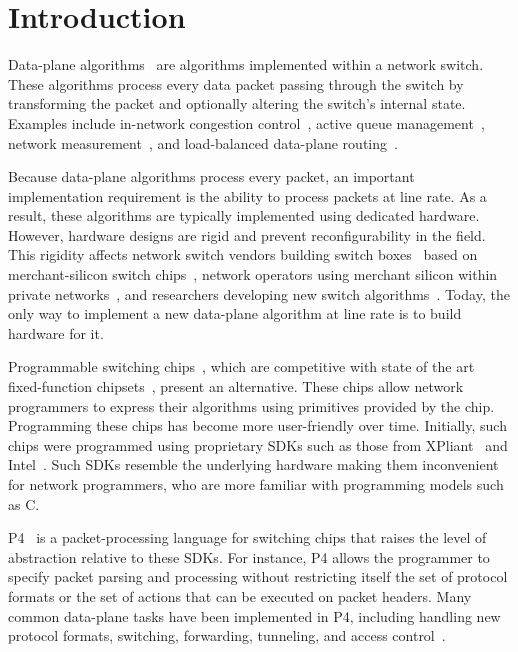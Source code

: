 \section{Introduction}
\label{s:intro}

Data-plane algorithms~\cite{cestan} are algorithms implemented within a network
switch. These algorithms process every data packet passing through the switch
by transforming the packet and optionally altering the switch's internal state.
Examples include in-network congestion control~\cite{xcp, rcp, pdq, dctcp},
active queue management~\cite{codel}, network measurement~\cite{opensketch,
bitmap_george, elephant_george}, and load-balanced data-plane
routing~\cite{conga}.

Because data-plane algorithms process every packet, an important implementation
requirement is the ability to process packets at line rate.  As a result, these
algorithms are typically implemented using dedicated hardware. However,
hardware designs are rigid and prevent reconfigurability in the field. This
rigidity affects network switch vendors building switch
boxes~\cite{cisco_nexus, dell_force10, arista_7050} based on merchant-silicon
switch chips~\cite{trident, tomahawk, mellanox}, network operators using
merchant silicon within private networks~\cite{google,facebook,vl2}, and
researchers developing new switch algorithms~\cite{xcp, codel, d3, detail,
pdq}. Today, the only way to implement a new data-plane algorithm at line rate
is to build hardware for it.

Programmable switching chips~\cite{flexpipe, xpliant, rmt}, which are
competitive with state of the art fixed-function chipsets~\cite{trident,
tomahawk, mellanox}, present an alternative.  These chips allow network
programmers to express their algorithms using primitives provided by the chip.
Programming these chips has become more user-friendly over time.  Initially,
such chips were programmed using proprietary SDKs such as those from
XPliant~\cite{xpliant_sdk, xpliant_sdk2} and Intel~\cite{intel_sdk}. Such SDKs
resemble the underlying hardware making them inconvenient for network
programmers, who are more familiar with programming models such as C.

P4~\cite{p4, p4spec} is a packet-processing language for switching chips that
raises the level of abstraction relative to these SDKs.  For instance, P4
allows the programmer to specify packet parsing and processing without
restricting itself the set of protocol formats or the set of actions that can
be executed on packet headers. Many common data-plane tasks have been
implemented in P4, including handling new protocol formats, switching,
forwarding, tunneling, and access control~\cite{dc_p4}.

